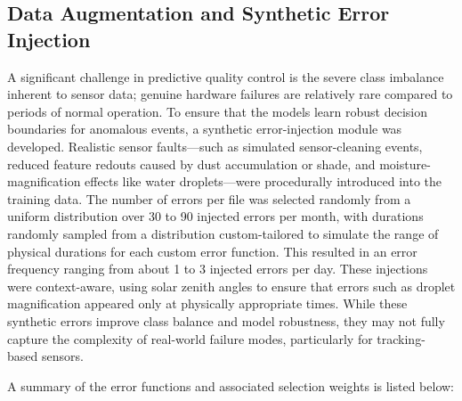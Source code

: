 \documentclass[12pt]{article}
\begin{document}
\subsection*{Data Augmentation and Synthetic Error Injection}
A significant challenge in predictive quality control is the severe class imbalance inherent to sensor data; genuine hardware failures are relatively rare compared to periods of normal operation. To ensure that the models learn robust decision boundaries for anomalous events, a synthetic error-injection module was developed. Realistic sensor faults---such as simulated sensor-cleaning events, reduced feature redouts caused by dust accumulation or shade, and moisture-magnification effects like water droplets---were procedurally introduced into the training data. The number of errors per file was selected randomly from a uniform distribution over 30 to 90 injected errors per month, with durations randomly sampled from a distribution custom-tailored to simulate the range of physical durations for each custom error function. This resulted in an error frequency ranging from about 1 to 3 injected errors per day. These injections were context-aware, using solar zenith angles to ensure that errors such as droplet magnification appeared only at physically appropriate times. While these synthetic errors improve class balance and model robustness, they may not fully capture the complexity of real-world failure modes, particularly for tracking-based sensors.

A summary of the error functions and associated selection weights is listed below:
\end{document}

